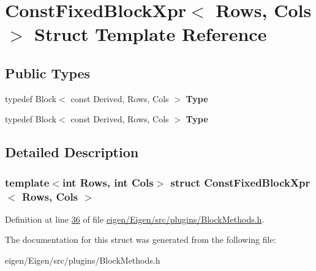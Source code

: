 \hypertarget{struct_const_fixed_block_xpr}{}\section{Const\+Fixed\+Block\+Xpr$<$ Rows, Cols $>$ Struct Template Reference}
\label{struct_const_fixed_block_xpr}
\subsection*{Public Types}
\begin{DoxyCompactItemize}
\item 
\mbox{\label{struct_const_fixed_block_xpr_aeef0c276ee139539e33171ef3ce64f92}} 
typedef Block$<$ const Derived, Rows, Cols $>$ {\bfseries Type}
\item 
\mbox{\label{struct_const_fixed_block_xpr_aeef0c276ee139539e33171ef3ce64f92}} 
typedef Block$<$ const Derived, Rows, Cols $>$ {\bfseries Type}
\end{DoxyCompactItemize}


\subsection{Detailed Description}
\subsubsection*{template$<$int Rows, int Cols$>$\newline
struct Const\+Fixed\+Block\+Xpr$<$ Rows, Cols $>$}



Definition at line \hyperlink{eigen_2_eigen_2src_2plugins_2_block_methods_8h_source_l00036}{36} of file \hyperlink{eigen_2_eigen_2src_2plugins_2_block_methods_8h_source}{eigen/\+Eigen/src/plugins/\+Block\+Methods.\+h}.



The documentation for this struct was generated from the following file\+:\begin{DoxyCompactItemize}
\item 
eigen/\+Eigen/src/plugins/\+Block\+Methods.\+h\end{DoxyCompactItemize}
